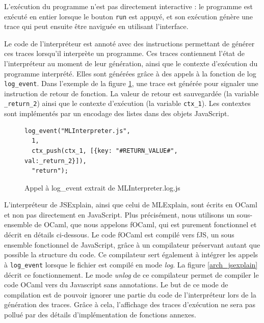\documentclass{easychair}
\begin{document}
L'exécution du programme n'est pas directement interactive : le programme est
exécuté en entier lorsque le bouton \texttt{run} est appuyé, et son exécution
génère une trace qui peut ensuite être naviguée en utilisant l'interface.

Le code de l'interpréteur est annoté avec des instructions permettant de générer
ces traces lorsqu'il interprète un programme. Ces traces contiennent l'état de
l'interpréteur au moment de leur génération, ainsi que le contexte d'exécution
du programme interprété. Elles sont générées grâce à des appels à la fonction de
log \verb|log_event|. Dans l'exemple de la figure \ref{log_event}, une trace est
générée pour signaler une instruction de retour de fonction. La valeur de retour
est sauvegardée (la variable \verb|_return_2|) ainsi que le contexte d'exécution
(la variable \verb|ctx_1|). Les contextes sont implémentés par un encodage des
listes dans des objets JavaScript.
\begin{figure}[ht]
\begin{verbatim}
log_event("MLInterpreter.js",
  1,
  ctx_push(ctx_1, [{key: "#RETURN_VALUE#", val:_return_2}]),
  "return");
\end{verbatim}
\caption{Appel à log\_event extrait de MLInterpreter.log.js}
\label{log_event}
\end{figure}

L'interpréteur de JSExplain, ainsi que celui de MLExplain, sont écrits en OCaml
et non pas directement en JavaScript. Plus précisément, nous utilisons un
sous-ensemble de OCaml, que nous appelons fOCaml, qui est purement fonctionnel
et décrit en détails ci-dessous. Le code fOCaml est compilé vers fJS, un sous
ensemble fonctionnel de JavaScript, grâce à un compilateur préservant autant que
possible la structure du code. Ce compilateur sert également à intégrer les
appels à \verb|log_event| lorsque le fichier est compilé en mode \emph{log}. La
figure \ref{arch_jsexplain} décrit ce fonctionnement. Le mode \emph{unlog} de ce
compilateur permet de compiler le code OCaml vers du Javascript sans
annotations. Le but de ce mode de compilation est de pouvoir ignorer une partie
du code de l'interpréteur lors de la génération des traces. Grâce à cela,
l'affichage des traces d'exécution ne sera pas pollué par des détails
d'implémentation de fonctions annexes.
\end{document}
